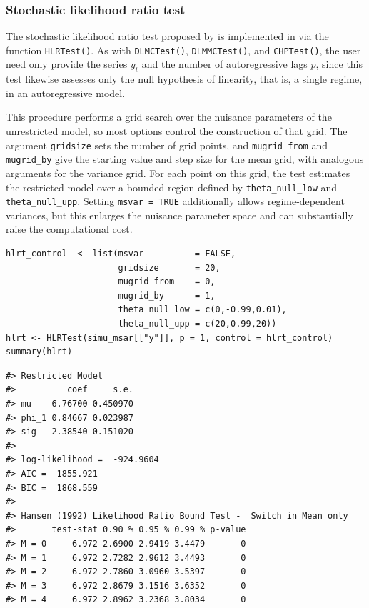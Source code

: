 \subsubsection{Stochastic likelihood ratio test}\label{stochastic-likelihood-ratio-test}

The stochastic likelihood ratio test proposed by \citet{hansen92} is implemented in  via the function \texttt{HLRTest()}. As with \texttt{DLMCTest()}, \texttt{DLMMCTest()}, and \texttt{CHPTest()}, the user need only provide the series \(y_t\) and the number of autoregressive lags \(p\), since this test likewise assesses only the null hypothesis of linearity, that is, a single regime, in an autoregressive model.

This procedure performs a grid search over the nuisance parameters of the unrestricted model, so most options control the construction of that grid. The argument \texttt{gridsize} sets the number of grid points, and \texttt{mugrid\_from} and \texttt{mugrid\_by} give the starting value and step size for the mean grid, with analogous arguments for the variance grid. For each point on this grid, the test estimates the restricted model over a bounded region defined by \texttt{theta\_null\_low} and \texttt{theta\_null\_upp}. Setting \texttt{msvar\ =\ TRUE} additionally allows regime-dependent variances, but this enlarges the nuisance parameter space and can substantially raise the computational cost.

\begin{verbatim}
hlrt_control  <- list(msvar          = FALSE,
                      gridsize       = 20,
                      mugrid_from    = 0,
                      mugrid_by      = 1,
                      theta_null_low = c(0,-0.99,0.01),
                      theta_null_upp = c(20,0.99,20))
hlrt <- HLRTest(simu_msar[["y"]], p = 1, control = hlrt_control)
summary(hlrt)
\end{verbatim}

\begin{verbatim}
#> Restricted Model
#>          coef     s.e.
#> mu    6.76700 0.450970
#> phi_1 0.84667 0.023987
#> sig   2.38540 0.151020
#> 
#> log-likelihood =  -924.9604
#> AIC =  1855.921
#> BIC =  1868.559
#> 
#> Hansen (1992) Likelihood Ratio Bound Test -  Switch in Mean only
#>       test-stat 0.90 % 0.95 % 0.99 % p-value
#> M = 0     6.972 2.6900 2.9419 3.4479       0
#> M = 1     6.972 2.7282 2.9612 3.4493       0
#> M = 2     6.972 2.7860 3.0960 3.5397       0
#> M = 3     6.972 2.8679 3.1516 3.6352       0
#> M = 4     6.972 2.8962 3.2368 3.8034       0
\end{verbatim}

